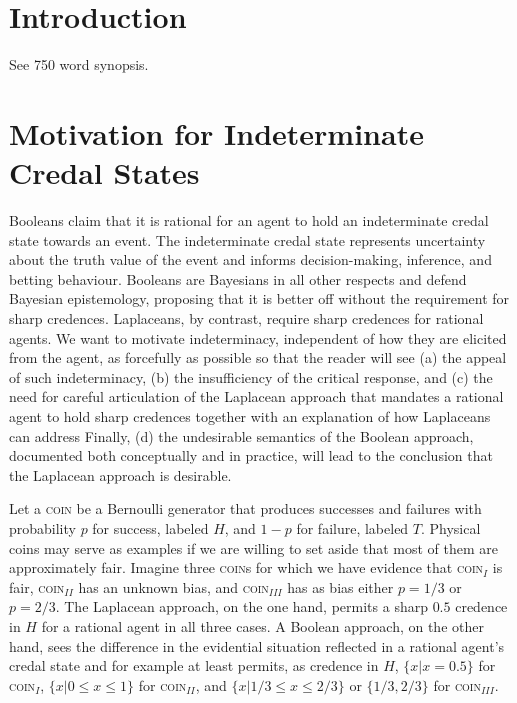 \section{Introduction}
\label{Introduction}

See 750 word synopsis.

\section{Motivation for Indeterminate Credal States}
\label{MotivationForIndeterminateCredal States}

Booleans claim that it is rational for an agent to hold
an indeterminate credal state towards an event. The
indeterminate credal state represents uncertainty about
the truth value of the event and informs
decision-making, inference, and betting behaviour.
Booleans are Bayesians in all other respects and defend
Bayesian epistemology, proposing that it is better off
without the requirement for sharp credences.
Laplaceans, by contrast, require sharp credences for
rational agents. We want to motivate indeterminacy,
independent of how they are elicited from the agent, as
forcefully as possible so that the reader will see (a)
the appeal of such indeterminacy, (b) the insufficiency
of the critical response, and (c) the need for careful
articulation of the Laplacean approach that mandates a
rational agent to hold sharp credences together with an
explanation of how Laplaceans can address Finally, (d)
the undesirable semantics of the Boolean approach,
documented both conceptually and in practice, will lead
to the conclusion that the Laplacean approach is
desirable.

Let a \textsc{coin} be a Bernoulli generator that
produces successes and failures with probability $p$
for success, labeled $H$, and $1-p$ for failure,
labeled $T$. Physical coins may serve as examples if we
are willing to set aside that most of them are
approximately fair. Imagine three \textsc{coin}s for
which we have evidence that \textsc{coin}$_{I}$ is
fair, \textsc{coin}$_{II}$ has an unknown bias, and
\textsc{coin}$_{III}$ has as bias either $p=1/3$ or
$p=2/3$. The Laplacean approach, on the one hand,
permits a sharp $0.5$ credence in $H$ for a rational
agent in all three cases. A Boolean approach, on the
other hand, sees the difference in the evidential
situation reflected in a rational agent's credal state
and for example at least permits, as credence in $H$,
$\{x|x=0.5\}$ for \textsc{coin}$_{I}$,
$\{x|0\leq{}x\leq{}1\}$ for \textsc{coin}$_{II}$, and
$\{x|1/3\leq{}x\leq{}2/3\}$ or $\{1/3,2/3\}$ for
\textsc{coin}$_{III}$.

